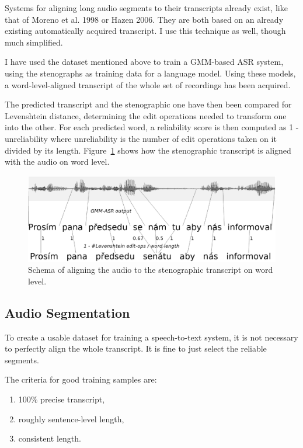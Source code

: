 \documentclass[runningheads,a4paper]{llncs}
\begin{document}
Systems for aligning long audio segments to their transcripts already exist,
like that of Moreno et al. 1998\cite{moreno1998recursive} or Hazen
2006\cite{hazen2006automatic}. They are both based on an already existing
automatically acquired transcript. I use this technique as well, though much
simplified.

I have used the dataset mentioned above\cite{pspdata} to train a GMM-based ASR
system, using the stenographs as training data for a language model. Using these
models, a word-level-aligned transcript of the whole set of recordings has been
acquired.

The predicted transcript and the stenographic one have then been compared for
Levenshtein distance, determining the edit operations needed to transform one
into the other. For each predicted word, a reliability score is then
computed as 1 - unreliability where unreliability is the number of edit
operations taken on it divided by its length.
Figure~\ref{fig:align} shows how the stenographic transcript is aligned with the
audio on word level.

\begin{figure}[htpb]
\includegraphics[scale=0.4]{rc/align.eps}
\caption{Schema of aligning the audio to the stenographic transcript on word
level.}
\label{fig:align}
\end{figure}

\subsection{Audio Segmentation}

To create a usable dataset for training a speech-to-text system, it is not
necessary to perfectly align the whole transcript. It is fine to just select the
reliable segments.

The criteria for good training samples are:
\begin{enumerate}
\item{100\% precise transcript,}
\item{roughly sentence-level length,}
\item{consistent length.}
\end{enumerate}
\end{document}

